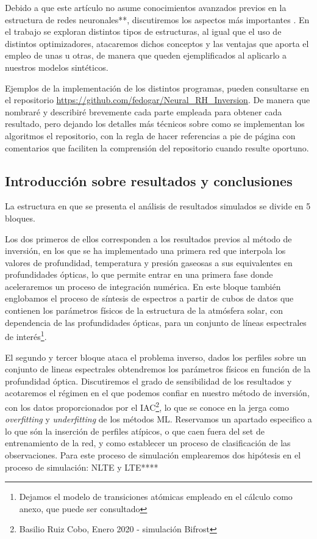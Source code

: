 \documentclass[8pt]{article}
\begin{document}
	Debido a que este artículo no asume conocimientos avanzados previos en la estructura de redes neuronales**, discutiremos los aspectos más importantes . En el trabajo se exploran distintos tipos de estructuras, al igual que el uso de distintos optimizadores, atacaremos dichos conceptos y las ventajas que aporta el empleo de unas u otras, de manera que queden ejemplificados al aplicarlo a nuestros modelos sintéticos.\newline
	
	Ejemplos de la implementación de los distintos programas, pueden consultarse en el repositorio \url{https://github.com/fedogar/Neural_RH_Inversion}. De manera que nombraré y describiré brevemente cada parte empleada para obtener cada resultado, pero dejando los detalles más técnicos sobre como se implementan los algoritmos el repositorio, con la regla de hacer referencias a pie de página con comentarios que faciliten la comprensión del repositorio cuando resulte oportuno.
	
	
	
	\subsection{Introducción sobre resultados y conclusiones}
	
	La estructura en que se presenta el análisis de resultados simulados se divide en 5 bloques.\newline
	
	Los dos primeros de ellos corresponden a los resultados previos al método de inversión, en los que se ha implementado una primera red que interpola los valores de profundidad, temperatura y presión gaseosas a sus equivalentes en profundidades ópticas, lo que permite entrar en una primera fase donde aceleraremos un proceso de integración numérica. En este bloque también englobamos el proceso de síntesis de espectros a partir de cubos de datos que contienen los parámetros físicos de la estructura de la atmósfera solar, con dependencia de las profundidades ópticas, para un conjunto de líneas espectrales de interés\footnote{Dejamos el modelo de transiciones atómicas empleado en el cálculo como anexo, que puede ser consultado}.\newline
		
	El segundo y tercer bloque ataca el problema inverso, dados los perfiles sobre un conjunto de lineas espectrales obtendremos los parámetros físicos en función de la profundidad óptica. Discutiremos el grado de sensibilidad de los resultados y acotaremos el régimen en el que podemos confiar en nuestro método de inversión, con los datos proporcionados por el IAC\footnote{Basilio Ruiz Cobo, Enero 2020 - simulación Bifrost},  lo que se conoce en la jerga como \textit{overfitting} y \textit{underfitting} de los métodos ML. Reservamos un apartado especifico a lo que són la inserción de perfiles atípicos, o que caen fuera del set de entrenamiento de la red, y como establecer un proceso de clasificación de las observaciones. Para este proceso de simulación emplearemos dos hipótesis en el proceso de simulación: NLTE y LTE**** \newline 
	
\end{document}

